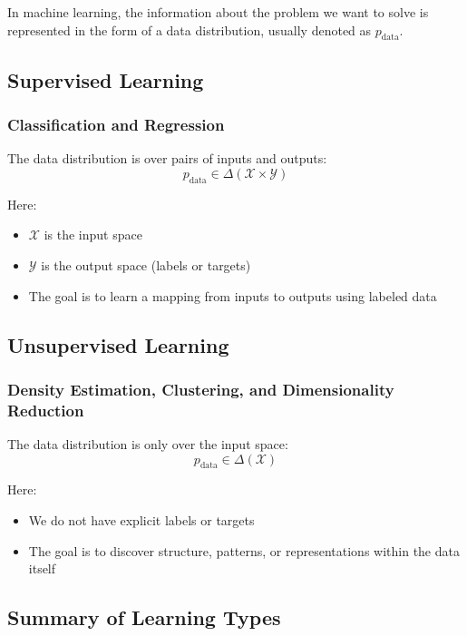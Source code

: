 \documentclass[11pt,a4paper]{article}
\theoremstyle{definition}
\theoremstyle{plain}
\theoremstyle{remark}
\begin{document}
In machine learning, the information about the problem we want to solve is represented in the form of a data distribution, usually denoted as $p_{\text{data}}$.

\subsection{Supervised Learning}

\subsubsection{Classification and Regression}

The data distribution is over pairs of inputs and outputs:
\[
p_{\text{data}} \in \Delta(\mathcal{X} \times \mathcal{Y})
\]

Here:
\begin{itemize}
    \item $\mathcal{X}$ is the input space
    \item $\mathcal{Y}$ is the output space (labels or targets)
    \item The goal is to learn a mapping from inputs to outputs using labeled data
\end{itemize}

\subsection{Unsupervised Learning}

\subsubsection{Density Estimation, Clustering, and Dimensionality Reduction}

The data distribution is only over the input space:
\[
p_{\text{data}} \in \Delta(\mathcal{X})
\]

Here:
\begin{itemize}
    \item We do not have explicit labels or targets
    \item The goal is to discover structure, patterns, or representations within the data itself
\end{itemize}

\subsection{Summary of Learning Types}
\end{document}
